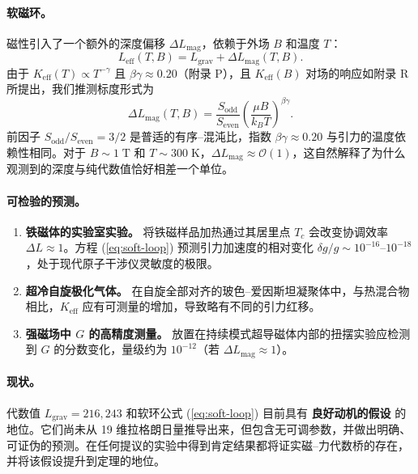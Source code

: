 \documentclass[12pt]{article}
\theoremstyle{remark}
\begin{document}
	\paragraph{软磁环。}
	磁性引入了一个额外的深度偏移 $\Delta L_{\mathrm{mag}}$，依赖于外场 $B$ 和温度 $T$：
	\begin{equation}
		L_{\mathrm{eff}}(T,B) = L_{\mathrm{grav}} + \Delta L_{\mathrm{mag}}(T,B).
	\end{equation}
	由于 $K_{\mathrm{eff}}(T) \propto T^{-\gamma}$ 且 $\beta\gamma \approx 0.20$（附录 P），且 $K_{\mathrm{eff}}(B)$ 对场的响应如附录 R 所提出，我们推测标度形式为
	\begin{equation}
		\boxed{
			\Delta L_{\mathrm{mag}}(T,B) =
			\frac{S_{\mathrm{odd}}}{S_{\mathrm{even}}}
			\left( \frac{\mu B}{k_B T} \right)^{\beta\gamma}
		}.
		\label{eq:soft-loop}
	\end{equation}
	前因子 $S_{\mathrm{odd}}/S_{\mathrm{even}} = 3/2$ 是普适的有序–混沌比，指数 $\beta\gamma \approx 0.20$ 与引力的温度依赖性相同。对于 $B \sim 1\;\mathrm{T}$ 和 $T \sim 300\;\mathrm{K}$，$\Delta L_{\mathrm{mag}} \approx \mathcal{O}(1)$，这自然解释了为什么观测到的深度与纯代数值恰好相差一个单位。
	
	\paragraph{可检验的预测。}
	\begin{enumerate}
		\item \textbf{铁磁体的实验室实验。} 将铁磁样品加热通过其居里点 $T_c$ 会改变协调效率 $\Delta L \approx 1$。方程 (\ref{eq:soft-loop}) 预测引力加速度的相对变化 $\delta g / g \sim 10^{-16}$–$10^{-18}$，处于现代原子干涉仪灵敏度的极限。
		\item \textbf{超冷自旋极化气体。} 在自旋全部对齐的玻色–爱因斯坦凝聚体中，与热混合物相比，$K_{\mathrm{eff}}$ 应有可测量的增加，导致略有不同的引力红移。
		\item \textbf{强磁场中 $G$ 的高精度测量。} 放置在持续模式超导磁体内部的扭摆实验应检测到 $G$ 的分数变化，量级约为 $10^{-12}$（若 $\Delta L_{\mathrm{mag}} \approx 1$）。
	\end{enumerate}
	
	\paragraph{现状。}
	代数值 $L_{\mathrm{grav}} = 216, 243$ 和软环公式 (\ref{eq:soft-loop}) 目前具有 \textbf{良好动机的假设} 的地位。它们尚未从 19 维拉格朗日量推导出来，但包含无可调参数，并做出明确、可证伪的预测。在任何提议的实验中得到肯定结果都将证实磁–力代数桥的存在，并将该假设提升到定理的地位。
	
\end{document}

